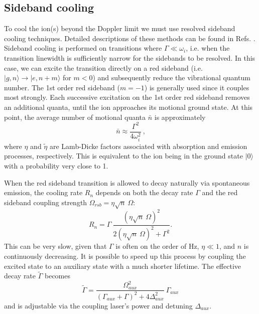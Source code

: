 \subsection{Sideband cooling}
To cool the ion(s) beyond the Doppler limit we must use resolved sideband cooling techniques. Detailed descriptions of these methods can be found in Refs. \cite{Leibfried03.RMP.75.281, Cirac92.PRA.46.2668, PhysRevA.20.1521, RevModPhys.58.699}. Sideband cooling is performed on transitions where $\Gamma \ll \omega_i$, i.e. when the transition linewidth is sufficiently narrow for the sidebands to be resolved. In this case, we can excite the transition directly on a red sideband (i.e. $|g,n\rangle \rightarrow |e, n+m\rangle$ for $m<0$) and subsequently reduce the vibrational quantum number. The 1st order red sideband ($m = -1$) is generally used since it couples most strongly. Each successive excitation on the 1st order red sideband removes an additional quanta, until the ion approaches its motional ground state. At this point, the average number of motional quanta $\bar{n}$ is approximately
\begin{equation}
\bar{n} \approx \frac{\Gamma^2}{4 \omega_i^2} \ \text{,} %
\end{equation}
where $\eta$ and $\tilde{\eta}$ are Lamb-Dicke factors associated with absorption and emission processes, respectively. %
This is equivalent to the ion being in the ground state $|0\rangle$ with a probability very close to 1. 

When the red sideband transition is allowed to decay naturally via spontaneous emission, the cooling rate $R_n$ depends on both the decay rate $\Gamma$ and the red sideband coupling strength $\Omega_{rsb} = \eta \sqrt{n} \ \Omega$:
\begin{equation}
R_n = \Gamma \ \frac{(\eta \sqrt{n} \ \Omega)^2}{2(\eta \sqrt{n} \ \Omega)^2 + \Gamma^2} \text{.}
\end{equation}
This can be very slow, given that $\Gamma$ is often on the order of Hz, $\eta \ll 1$, and $n$ is continuously decreasing. It is possible to speed up this process by coupling the excited state to an auxiliary state with a much shorter lifetime. The effective decay rate $\tilde{\Gamma}$ becomes
\begin{equation}
\tilde{\Gamma} = \frac{\Omega_{aux}^2}{(\Gamma_{aux} + \Gamma)^2 + 4 \Delta_{aux}^2} \ \Gamma_{aux}
\end{equation}
and is adjustable via the coupling laser's power and detuning $\Delta_{aux}$. 

